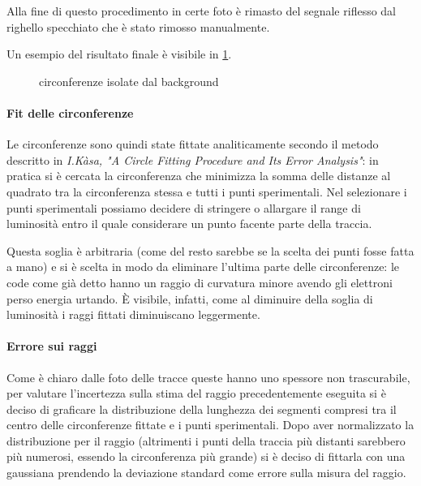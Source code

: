 Alla fine di questo procedimento in certe foto è rimasto del segnale riflesso dal righello specchiato che è stato rimosso manualmente.

Un esempio del risultato finale è visibile in \figurename{ \ref{circ}}.

\begin{figure}[H]
	\centering
	\caption{circonferenze isolate dal background}
	\label{circ}
\end{figure}

\paragraph{Fit delle circonferenze} Le circonferenze sono quindi state fittate analiticamente secondo il metodo descritto in \emph{I.Kàsa, "A Circle Fitting Procedure and Its Error Analysis"}: in pratica si è cercata la circonferenza che minimizza la somma delle distanze al quadrato tra la circonferenza stessa e tutti i punti sperimentali.
Nel selezionare i punti sperimentali possiamo decidere di stringere o allargare il range di luminosità entro il quale considerare un punto facente parte della traccia.

Questa soglia è arbitraria (come del resto sarebbe se la scelta dei punti fosse fatta a mano) e si è scelta in modo da eliminare l'ultima parte delle circonferenze: le code come già detto hanno un raggio di curvatura minore avendo gli elettroni perso energia urtando. È visibile, infatti, come al diminuire della soglia di luminosità i raggi fittati diminuiscano leggermente.

\paragraph{Errore sui raggi} Come è chiaro dalle foto delle tracce queste hanno uno spessore non trascurabile, per valutare l'incertezza sulla stima del raggio precedentemente eseguita si è deciso di graficare la distribuzione della lunghezza dei segmenti compresi tra il centro delle circonferenze fittate e i punti sperimentali.
Dopo aver normalizzato la distribuzione per il raggio (altrimenti i punti della traccia più distanti sarebbero più numerosi, essendo la circonferenza più grande) si è deciso di fittarla con una gaussiana prendendo la deviazione standard come errore sulla misura del raggio.


